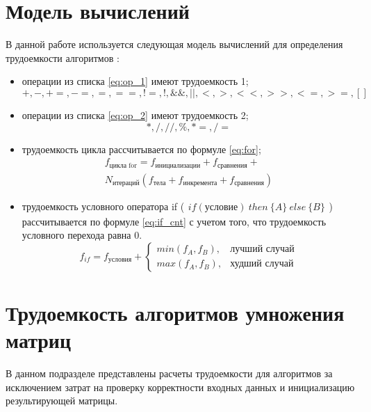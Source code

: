 \documentclass[a4paper,oneside,14pt]{extreport}
\begin{document}
\section{Модель вычислений}
В данной работе используется следующая модель вычислений для определения трудоемкости алгоритмов \cite{ulanov}:
\begin{itemize}
	\item операции из списка \ref{eq:op_1} имеют трудоемкость 1;
	\begin{equation} \label{eq:op_1}
	+, -, +=, -=, =, ==, !=, !, \&\&, ||, <, >, <<, >>, <=, >=, [] 
	\end{equation}
	\item операции из списка \ref{eq:op_2} имеют трудоемкость 2;
	\begin{equation} \label{eq:op_2}
	*, /, //, \%, *=, /=
	\end{equation}
	\item трудоемкость цикла рассчитывается по формуле \ref{eq:for};
	\begin{equation} \label{eq:for}
	\begin{array}{ll}
		f_{\text{цикла for}} = f_{\text{инициализации}} + f_{\text{сравнения}} +\\
		N_{\text{итераций}} (f_{\text{тела}} + f_{\text{инкремента}} + f_{\text{сравнения}})
	\end{array}
	\end{equation}
	\item трудоемкость условного оператора if ($
	\begin{array}{ll}
	if (\text{условие}) \ then \ \{A\}\ else \	 \{B\}  
	\end{array}
	$) рассчитывается по формуле \ref{eq:if_cnt} с учетом того, что трудоемкость условного перехода равна 0. \\
	\begin{equation} \label{eq:if_cnt}
	f_{if} = f_{\text{условия}} +
	\begin{cases}
	min(f_A, f_B), & \textrm{лучший случай}\\
	max(f_A, f_B), & \textrm{худший случай}
	\end{cases}
	\end{equation}
\end{itemize}

\section{Трудоемкость алгоритмов умножения матриц}
В данном подразделе представлены расчеты трудоемкости для алгоритмов за исключением затрат на проверку корректности входных данных и инициализацию результирующей матрицы.
\end{document}
